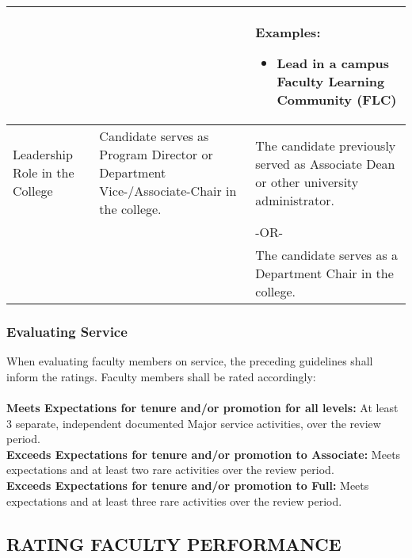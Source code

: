 \documentclass{scrartcl}
\begin{document}
\begin{longtable}{p{3cm}p{5.5cm}P{5.5cm}}
 & &
 Examples:
	\begin{itemize}[noitemsep,leftmargin=*,topsep=0pt,partopsep=0pt]
    \item Lead in a campus
Faculty Learning Community
(FLC)
	\end{itemize}
  \\ 
\hline
Leadership Role in the College & Candidate serves as Program Director or Department
Vice-/Associate-Chair in the college.
& The candidate previously served as Associate Dean or other university administrator. \\
& & -OR- \\
& & The candidate serves as a Department Chair in the college. \\
\hline
\end{longtable}

\subsubsection{Evaluating Service}
When evaluating faculty members on service, the preceding guidelines shall inform the ratings. Faculty members shall be rated accordingly:
\\\\
\textbf{Meets Expectations for tenure and/or promotion for all levels:} At least 3 separate, independent documented Major service activities, over the review period.
\\
\textbf{Exceeds Expectations for tenure and/or promotion to Associate:} Meets expectations and at least two rare activities over the review period.
\\
\textbf{Exceeds Expectations for tenure and/or promotion to Full:} Meets expectations and at least three rare activities over the review period.

\subsection{RATING FACULTY PERFORMANCE}
\end{document}
